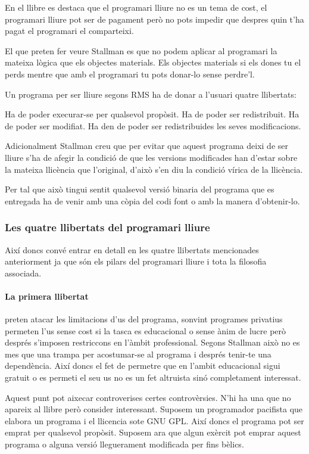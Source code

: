 \documentclass[a4paper,11pt]{scrartcl}
\begin{document}
En el llibre es destaca que el programari lliure no es un tema de cost,
el programari lliure pot ser de pagament però no pots impedir que despres quin
t'ha pagat el programari el comparteixi.

El que preten fer veure Stallman es que no podem aplicar al programari
la mateixa lògica que els objectes materials. Els objectes materials si els
dones tu el perds mentre que amb el programari tu pots donar-lo sense
perdre'l.

Un programa per ser lliure segons RMS ha de donar a l'usuari quatre llibertats:
  
  Ha de poder execurar-se per qualsevol propòsit.
  Ha de poder ser redistribuit.
  Ha de poder ser modifiat.
  Ha den de poder ser redistribuides les seves modificacions.
  
Adicionalment Stallman creu que per evitar que aquest programa
deixi de ser lliure s'ha de afegir la condició de que les versions
modificades han d'estar sobre la mateixa llicència que l'original,
d'això s'en diu la condició vírica de la llicència.

Per tal que això tingui sentit qualsevol versió binaria del programa
que es entregada ha de venir amb una còpia del codi font o amb la
manera d'obtenir-lo.

\subsubsection{Les quatre llibertats del programari lliure}
Així doncs convé entrar en detall en les quatre llibertats mencionades
anteriorment ja que són els pilars del programari lliure i tota
la filosofia associada.

\paragraph{La primera llibertat} preten atacar les limitacions d'us del programa,
sonvint programes privatius permeten l'us sense cost si la
tasca es educacional o sense ànim de lucre però després s'imposen
restriccons en l'àmbit professional. Segons Stallman això no
es mes que una trampa per acostumar-se al programa i després
tenir-te una dependència. Així doncs el fet de permetre que en l'ambit
educacional sigui gratuit o es permeti el seu us no es un fet
altruista sinó completament interessat.

Aquest punt pot aixecar controverises certes controvèrsies. N'hi ha
una que no apareix al llibre però consider interessant. Suposem
un programador pacifista que elabora un programa i el llicencia
sote GNU GPL. Així doncs el programa pot ser emprat per qualsevol
propòsit. Suposem ara que algun exèrcit pot emprar aquest programa
o alguna versió lleguerament modificada per fins bèlics.
\end{document}
